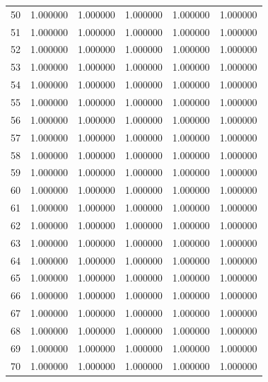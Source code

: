 \begin{tabular}{lrrrrr}
50 & 1.000000 & 1.000000 & 1.000000 & 1.000000 & 1.000000 \\
51 & 1.000000 & 1.000000 & 1.000000 & 1.000000 & 1.000000 \\
52 & 1.000000 & 1.000000 & 1.000000 & 1.000000 & 1.000000 \\
53 & 1.000000 & 1.000000 & 1.000000 & 1.000000 & 1.000000 \\
54 & 1.000000 & 1.000000 & 1.000000 & 1.000000 & 1.000000 \\
55 & 1.000000 & 1.000000 & 1.000000 & 1.000000 & 1.000000 \\
56 & 1.000000 & 1.000000 & 1.000000 & 1.000000 & 1.000000 \\
57 & 1.000000 & 1.000000 & 1.000000 & 1.000000 & 1.000000 \\
58 & 1.000000 & 1.000000 & 1.000000 & 1.000000 & 1.000000 \\
59 & 1.000000 & 1.000000 & 1.000000 & 1.000000 & 1.000000 \\
60 & 1.000000 & 1.000000 & 1.000000 & 1.000000 & 1.000000 \\
61 & 1.000000 & 1.000000 & 1.000000 & 1.000000 & 1.000000 \\
62 & 1.000000 & 1.000000 & 1.000000 & 1.000000 & 1.000000 \\
63 & 1.000000 & 1.000000 & 1.000000 & 1.000000 & 1.000000 \\
64 & 1.000000 & 1.000000 & 1.000000 & 1.000000 & 1.000000 \\
65 & 1.000000 & 1.000000 & 1.000000 & 1.000000 & 1.000000 \\
66 & 1.000000 & 1.000000 & 1.000000 & 1.000000 & 1.000000 \\
67 & 1.000000 & 1.000000 & 1.000000 & 1.000000 & 1.000000 \\
68 & 1.000000 & 1.000000 & 1.000000 & 1.000000 & 1.000000 \\
69 & 1.000000 & 1.000000 & 1.000000 & 1.000000 & 1.000000 \\
70 & 1.000000 & 1.000000 & 1.000000 & 1.000000 & 1.000000 \\
\bottomrule
\end{tabular}
